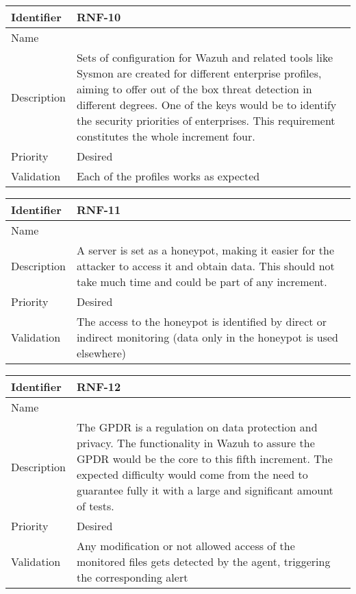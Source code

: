 \begin{table}[H]
	\begin{tabularx}{\textwidth}{|l|X|}
		\hline
		\rowcolor{gray!30}
		Identifier & \textbf{RNF-10} \\ \hline
		Name & \RNFdiez \\ \hline
		Description & Sets of configuration for Wazuh and related tools like Sysmon are created for different enterprise profiles, aiming to offer out of the box threat detection in different degrees. One of the keys would be to identify the security priorities of enterprises. This requirement constitutes the whole increment four. \\ \hline
		Priority & Desired \\ \hline
		Validation & Each of the profiles works as expected \\ \hline
	\end{tabularx}
\end{table}
\begin{table}[H]
	\begin{tabularx}{\textwidth}{|l|X|}
		\hline
		\rowcolor{gray!30}
		Identifier & \textbf{RNF-11} \\ \hline
		Name & \RNFonce \\ \hline
		Description & A server is set as a honeypot, making it easier for the attacker to access it and obtain data. This should not take much time and could be part of any increment. \\ \hline
		Priority & Desired \\ \hline
		Validation & The access to the honeypot is identified by direct or indirect monitoring (data only in the honeypot is used elsewhere) \\ \hline
	\end{tabularx}
\end{table}
\begin{table}[H]
	\begin{tabularx}{\textwidth}{|l|X|}
		\hline
		\rowcolor{gray!30}
		Identifier & \textbf{RNF-12} \\ \hline
		Name & \RNFdoce \\ \hline
		Description & The GPDR is a regulation on data protection and privacy. The functionality in Wazuh to assure the GPDR would be the core to this fifth increment. The expected difficulty would come from the need to guarantee fully it with a large and significant amount of tests.  \\ \hline
		Priority & Desired \\ \hline
		Validation & Any modification or not allowed access of the monitored files gets detected by the agent, triggering the corresponding alert \\ \hline
	\end{tabularx}
\end{table}
